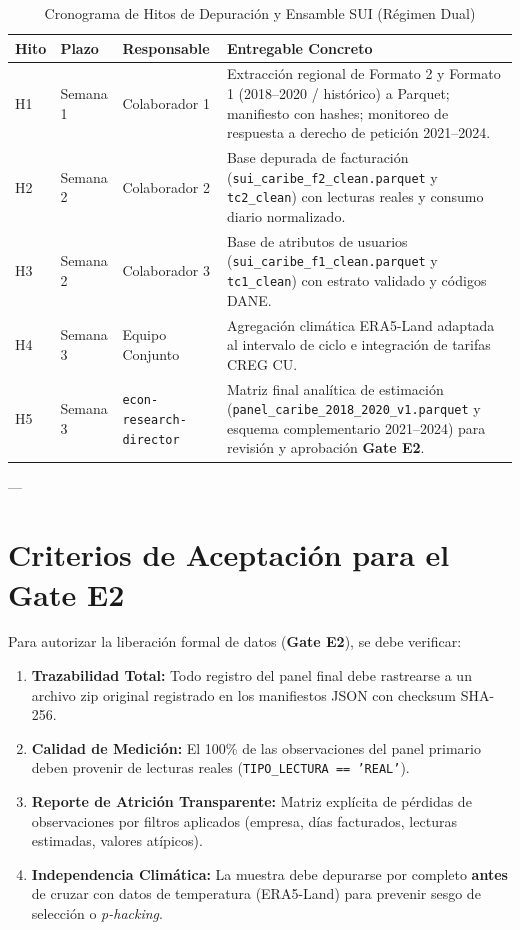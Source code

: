 \documentclass[11pt,a4paper]{article}
\begin{document}
\begin{table}[h!]
\centering
\caption{Cronograma de Hitos de Depuración y Ensamble SUI (Régimen Dual)}
\label{tab:cronograma}
\begin{tabular}{@{}lllp{7.2cm}@{}}
\toprule
\textbf{Hito} & \textbf{Plazo} & \textbf{Responsable} & \textbf{Entregable Concreto} \\ \midrule
H1 & Semana 1 & Colaborador 1 & Extracción regional de Formato 2 y Formato 1 (2018--2020 / histórico) a Parquet; manifiesto con hashes; monitoreo de respuesta a derecho de petición 2021--2024. \\
H2 & Semana 2 & Colaborador 2 & Base depurada de facturación (\texttt{sui\_caribe\_f2\_clean.parquet} y \texttt{tc2\_clean}) con lecturas reales y consumo diario normalizado. \\
H3 & Semana 2 & Colaborador 3 & Base de atributos de usuarios (\texttt{sui\_caribe\_f1\_clean.parquet} y \texttt{tc1\_clean}) con estrato validado y códigos DANE. \\
H4 & Semana 3 & Equipo Conjunto & Agregación climática ERA5-Land adaptada al intervalo de ciclo e integración de tarifas CREG CU. \\
H5 & Semana 3 & \texttt{econ-research-director} & Matriz final analítica de estimación (\texttt{panel\_caribe\_2018\_2020\_v1.parquet} y esquema complementario 2021--2024) para revisión y aprobación \textbf{Gate E2}. \\ \bottomrule
\end{tabular}
\end{table}

---

\section{Criterios de Aceptación para el Gate E2}

Para autorizar la liberación formal de datos (\textbf{Gate E2}), se debe verificar:
\begin{enumerate}
    \item \textbf{Trazabilidad Total:} Todo registro del panel final debe rastrearse a un archivo zip original registrado en los manifiestos JSON con checksum SHA-256.
    \item \textbf{Calidad de Medición:} El 100\% de las observaciones del panel primario deben provenir de lecturas reales (\texttt{TIPO\_LECTURA == 'REAL'}).
    \item \textbf{Reporte de Atrición Transparente:} Matriz explícita de pérdidas de observaciones por filtros aplicados (empresa, días facturados, lecturas estimadas, valores atípicos).
    \item \textbf{Independencia Climática:} La muestra debe depurarse por completo \textbf{antes} de cruzar con datos de temperatura (ERA5-Land) para prevenir sesgo de selección o \textit{p-hacking}.
\end{enumerate}
\end{document}
